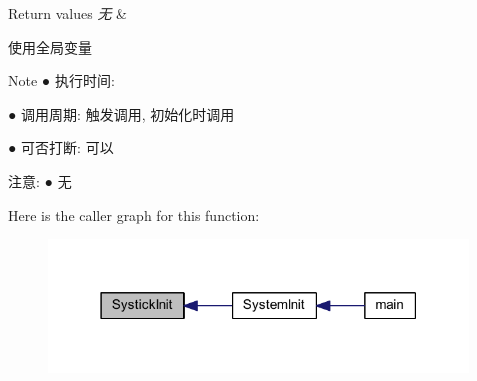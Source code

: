 \begin{DoxyRetVals}{\-Return values}
{\em 无} & \\
\hline
\end{DoxyRetVals}
\begin{DoxyParagraph}{使用全局变量 }

\end{DoxyParagraph}
\begin{DoxyNote}{\-Note}
● 执行时间\-: \par
 ● 调用周期\-: 触发调用, 初始化时调用 \par
 ● 可否打断\-: 可以 \par

\end{DoxyNote}
\begin{DoxyParagraph}{注意\-:}
● 无 \par
 
\end{DoxyParagraph}


\-Here is the caller graph for this function\-:\nopagebreak
\begin{figure}[H]
\begin{center}
\leavevmode
\includegraphics[width=316pt]{group___systick_ga6a4dda3916b88b3f9865a6139918cd51_icgraph}
\end{center}
\end{figure}


